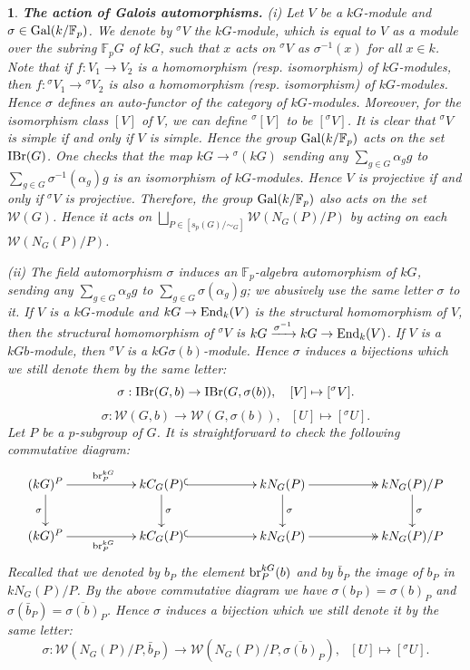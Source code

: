 \documentclass[preprint,12pt,3p]{elsarticle}
\newtheorem{void}[theorem]{}
\def\IBr{{\rm IBr}}
\def\br{{\rm br}}
\def\End{{\rm End}}
\def\Gal{{\rm Gal}}
\def\W{\mathcal{W}}
\def\F{\mathbb{F}}
\begin{document}
\begin{void}
{\rm \textbf{The action of Galois automorphisms.} (i) Let $V$ be a $kG$-module and $\sigma\in\Gal(k/\F_p)$. We denote by ${}^\sigma V$ the $kG$-module, which is equal to $V$ as a module over the subring $\F_pG$ of $kG$, such that $x$ acts on ${}^\sigma V$ as $\sigma^{-1}(x)$ for all $x\in k$. Note that if $f:V_1\to V_2$ is a homomorphism (resp. isomorphism) of $kG$-modules, then $f:{}^\sigma V_1\to {}^\sigma V_2$ is also a homomorphism (resp. isomorphism) of $kG$-modules. Hence $\sigma$ defines an auto-functor of the category of $kG$-modules. Moreover, for the isomorphism class $[V]$ of $V$, we can define ${}^\sigma[V]$ to be $[{}^\sigma V]$. It is clear that ${}^\sigma V$ is simple if and only if $V$ is simple. Hence the group $\Gal(k/\F_p)$ acts on the set $\IBr(G)$. One checks that the map $kG\to {}^\sigma(kG)$ sending any $\sum_{g\in G}\alpha_gg$ to $\sum_{g\in G} \sigma^{-1}(\alpha_g)g$ is an isomorphism of $kG$-modules. Hence $V$ is projective if and only if ${}^\sigma V$ is projective. Therefore, the group $\Gal(k/\F_p)$ also acts on the set $\W(G)$. Hence it acts on $\bigsqcup_{P\in [s_p(G)/\sim_G]}\W(N_G(P)/P)$ by acting on each $\W(N_G(P)/P)$.

(ii) The field automorphism $\sigma$ induces an $\F_p$-algebra automorphism of $kG$, sending any $\sum_{g\in G}\alpha_gg$ to $\sum_{g\in G}\sigma(\alpha_g)g$; we abusively use the same letter $\sigma$ to it. If $V$ is a $kG$-module and $kG\to \End_k(V)$ is the structural homomorphism of $V$, then the structural homomorphism of ${}^\sigma V$ is $kG\xrightarrow{\sigma^{-1}} kG\to \End_k(V)$. If $V$ is a $kGb$-module, then ${}^\sigma V$ is a $kG\sigma(b)$-module. Hence $\sigma$ induces a bijections which we still denote them by the same letter:
$$\sigma:\IBr(G,b)\to \IBr(G,\sigma(b)),~~~[V]\mapsto [{}^\sigma V].$$
$$\sigma:\W(G,b)\to \W(G,\sigma(b)),~~~[U]\mapsto [{}^\sigma U].$$
Let $P$ be a $p$-subgroup of $G$. It is straightforward to check the following commutative diagram:
$$\xymatrix{ (kG)^P\ar[d]_{\sigma}\ar[rr]^{\br_P^{kG}} & & kC_G(P)\ar[d]^{\sigma}\ar@{^{(}->}[rr] &  & kN_G(P)\ar[d]^{\sigma} \ar@{->>}[rr]  &  & kN_G(P)/P \ar[d]^{\sigma}\\
	(kG)^P\ar[rr]_{\br_P^{kG}} &  & kC_G(P)\ar@{^{(}->}[rr]  &  &   kN_G(P) \ar@{->>}[rr] &   & kN_G(P)/P
}$$
Recalled that we denoted by $b_P$ the element $\br_P^{kG}(b)$ and by $\bar{b}_P$ the image of $b_P$ in $kN_G(P)/P$. By the above commutative diagram we have $\sigma(b_P)=\sigma(b)_P$ and $\sigma(\bar{b}_P)=\overline{\sigma(b)}_P$.
Hence $\sigma$ induces a bijection which we still denote it by the same letter:
$$\sigma:\W(N_G(P)/P,\bar{b}_P)\to \W(N_G(P)/P,\overline{\sigma(b)}_P),~~~[U]\mapsto [{}^\sigma U].$$
}
\end{void}
\end{document}
